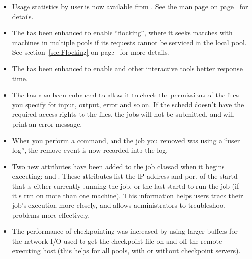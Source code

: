 \begin{itemize}
\item Usage statistics by user is now available from
.
See the man page on page~\pageref{man-condor-userprio} for details. 

\item The  has been enhanced to enable ``flocking'',
where it seeks matches with machines in multiple pools if its requests
cannot be serviced in the local pool.
See section~\ref{sec:Flocking} on page~\pageref{sec:Flocking} for more
details.

\item The  has been enhanced to enable  and
other interactive tools better response time.

\item The  has also been enhanced to allow it to check
the permissions of the files you specify for input, output, error and
so on.  
If the schedd doesn't have the required access rights to the files,
the jobs will not be submitted, and  will print an
error message.

\item When you perform a  command, and the job you removed
was using a ``user log'', the remove event is now recorded into the
log. 

\item Two new attributes have been added to the job classad when it 
begins executing:  and .
These attributes list the IP address and port of the startd that is
either currently running the job, or the last startd to run the job
(if it's run on more than one machine). 
This information helps users track their job's execution more closely,
and allows administrators to troubleshoot problems more effectively. 

\item The performance of checkpointing was increased by using larger
buffers for the network I/O used to get the checkpoint file on and off
the remote executing host (this helps for all pools, with or without
checkpoint servers). 

\end{itemize}

